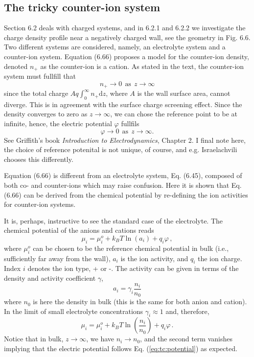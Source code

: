 \documentclass[11pt]{article}
\renewcommand{\d}{\mathrm{d}}
\begin{document}
\subsection*{The tricky counter-ion system}
Section 6.2 deals with charged systems, and in 6.2.1 and 6.2.2 we investigate the 
charge density profile near a negatively charged wall, see the geometry in Fig. 6.6. 
Two different systems are considered, namely, an electrolyte system and a counter-ion system. 
Equation (6.66) proposes a model for the counter-ion density, denoted $n_+$ as the counter-ion is 
a cation. As stated in the text, the counter-ion system must fullfill that
\begin{equation}
\label{eq:tc:n+zero}	
	n_+ \rightarrow 0 \ \ \text{as} \ \ z \rightarrow \infty
\end{equation}
since the total charge $A q\int_0^\infty n_+ \d z$, where $A$ is the wall surface area, cannot 
diverge. This is in agreement with the surface charge screening effect. Since
the density converges to zero as $z \rightarrow \infty$, we can chose the
reference point to be at infinite, hence, the electric potential $\varphi$ fullfils  
\begin{equation}
\label{eq:tc:potential}
 \varphi \rightarrow 0 \ \ \text{as} \ \ z \rightarrow \infty.
\end{equation}
See Griffith's book \emph{Introduction to Electrodynamics}, Chapter 2. I final note here, the choice of
reference potenital is not unique, of course, and e.g. Israelachvili chooses this differently. 

Equation (6.66) is different from an electrolyte system, Eq. (6.45), composed of both co- and 
counter-ions which may raise confusion. Here it is shown that Eq. (6.66) can be derived from the 
chemical potential by re-defining the ion activities for counter-ion systems.

It is, perhaps, instructive to see the standard case of the electrolyte. The chemical potential of 
the anions and cations reads
\begin{equation}
	\mu_i = \mu_i^o + k_BT\ln(a_i) + q_i\varphi \, ,
\end{equation}
where $\mu_i^o$ can be chosen to be the reference chemical potential in bulk (i.e., sufficiently 
far away from the wall), $a_i$ is the ion activity, and $q_i$ the ion         
charge. Index $i$ denotes the ion type, + or -. The activity can be given in terms of the 
density and activity coefficient $\gamma$, 
\begin{equation}
\label{eq:tc:activity0}
a_i = \gamma_i \frac{n_i}{n_0} 
\end{equation}
where $n_0$ is here the density in bulk (this is the same for both anion and cation). In the limit 
of small electrolyte concentrations $\gamma_i \approx 1$ and, therefore,
\begin{equation}
	\mu_i = \mu_i^o + k_BT\ln\left(\frac{n_i}{n_0}\right) + q_i\varphi \, .
\end{equation}
Notice that in bulk, $z \rightarrow \infty$, we have $n_i \rightarrow n_0$, and the second term 
vanishes implying that the electric potential follows Eq. (\ref{eq:tc:potential}) as expected. 
\end{document}

